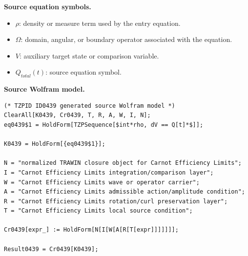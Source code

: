\begin{minipage}[t]{0.49\linewidth}
\begingroup
\small
\raggedright
\textbf{Source equation symbols.}\par
\begin{itemize}[leftmargin=1.35em,itemsep=1pt,topsep=1pt,parsep=0pt]
    \item $\rho$: density or measure term used by the entry equation.
    \item $\Omega$: domain, angular, or boundary operator associated with the equation.
    \item $V$: auxiliary target state or comparison variable.
    \item $Q_{total}(t)$: source equation symbol.
\end{itemize}
\endgroup
\end{minipage}\hfill
\begin{minipage}[t]{0.47\linewidth}
\begingroup
\scriptsize
\raggedright
\textbf{Source Wolfram model.}\par
\begin{Verbatim}[fontsize=\tiny,breaklines=true,breakanywhere=true]
(* TZPID ID0439 generated source Wolfram model *)
ClearAll[K0439, Cr0439, T, R, A, W, I, N];
eq0439$1 = HoldForm[TZPSequence[$int*rho, dV == Q[t]*$]];

K0439 = HoldForm[{eq0439$1}];

N = "normalized TRAWIN closure object for Carnot Efficiency Limits";
I = "Carnot Efficiency Limits integration/comparison layer";
W = "Carnot Efficiency Limits wave or operator carrier";
A = "Carnot Efficiency Limits admissible action/amplitude condition";
R = "Carnot Efficiency Limits rotation/curl preservation layer";
T = "Carnot Efficiency Limits local source condition";

Cr0439[expr_] := HoldForm[N[I[W[A[R[T[expr]]]]]]];

Result0439 = Cr0439[K0439];
\end{Verbatim}
\endgroup
\end{minipage}

